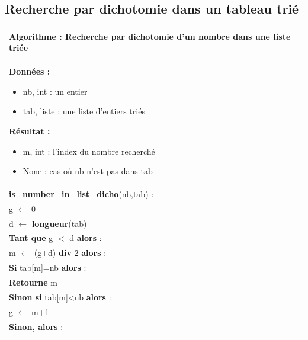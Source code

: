 \documentclass[10pt]{article}
\begin{document}
\subsection{Recherche par dichotomie dans un tableau trié}


\begin{minipage}[c]{.48\linewidth}
\begin{pseudo}
\begin{center}
\begin{tabular}{p{}}
\hline
\textbf{Algorithme :} Recherche par dichotomie d'un nombre dans une liste triée\\
\hline
\textbf{Données :}
\begin{itemize}
\item \textsf{nb}, int : un entier 
\item \textsf{tab}, liste : une liste d'entiers triés
\end{itemize}
\textbf{Résultat :} 
\begin{itemize}
\item \textsf{m}, int : l'index du nombre recherché
\item \textsf{None} : cas où \textsf{nb} n'est pas dans \textsf{tab}
\end{itemize}
\\
\textbf{is\_number\_in\_list\_dicho}(\textsf{nb},\textsf{tab}) :\\
\hspace{.4cm}\textsf{g} $\leftarrow$ \textsf{0} \\
\hspace{.4cm}\textsf{d} $\leftarrow$ \textbf{longueur}(\textsf{tab}) \\
\hspace{.4cm}\textbf{Tant que} \textsf{g $<$ d} \textbf{alors} : \\
\hspace{.8cm} \textsf{m} $\leftarrow$ \textsf{(g+d)} \textbf{div} \textsf{2} \textbf{alors} :\\
\hspace{1.2cm}\textbf{Si} \textsf{tab[m]=nb} \textbf{alors} :\\
\hspace{1.6cm}\textbf{Retourne} \textsf{m}\\
\hspace{1.2cm}\textbf{Sinon si} \textsf{tab[m]<nb} \textbf{alors} :\\
\hspace{1.6cm}\textsf{g} $\leftarrow$ \textsf{m+1}\\
\hspace{1.2cm}\textbf{Sinon, alors} :\\

\end{tabular}
\end{center}
\end{pseudo}
\end{minipage}
\end{document}
